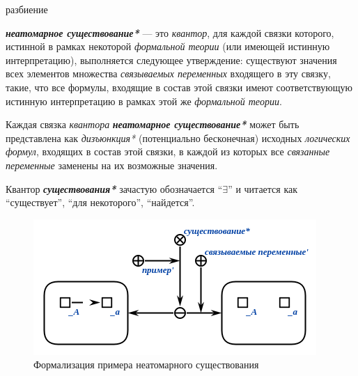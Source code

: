 \begin{SCn}
\begin{scnreltoset}{разбиение}
\end{scnreltoset}

\end{SCn}

\textbf{\textit{неатомарное существование*}} --- это \textit{квантор}, для каждой связки которого, истинной в рамках некоторой \textit{формальной теории} (или имеющей истинную интерпретацию), выполняется следующее утверждение: существуют значения всех элементов множества \textit{связываемых переменных\scnrolesign} входящего в эту связку, такие, что все формулы, входящие в состав этой связки имеют соответствующую истинную интерпретацию в рамках этой же \textit{формальной теории}.

Каждая связка \textit{квантора} \textbf{\textit{неатомарное существование*}} может быть представлена как \textit{дизъюнкция*} (потенциально бесконечная) исходных \textit{логических формул}, входящих в состав этой связки, в каждой из которых все \textit{связанные переменные\scnrolesign} заменены на их возможные значения.

Квантор \textbf{\textit{существования*}} зачастую обозначается ``$\exists$'' и читается как ``существует'', ``для некоторого'', ``найдется''.

\begin{figure}[http]
\includegraphics[scale=0.8]{author/part2/figures/logic/non_atomicExistence.png}
\caption{Формализация примера неатомарного существования}
\label{fig:non_atomic_existence}
\end{figure}

\begin{SCn}
\end{SCn}


